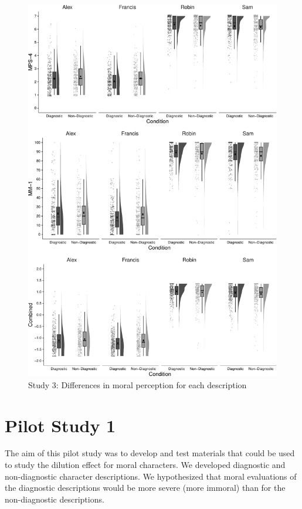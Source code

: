 \documentclass[
  man,floatsintext]{apa6}
\begin{document}
\begin{figure}[!p]
\includegraphics{Supplementary_files/figure-latex/S3allscenariosPlot-1} \caption{Study 3: Differences in moral perception for each description}\label{fig:S3allscenariosPlot}
\end{figure}

\pagebreak

\section{Pilot Study 1}\label{pilot-study-1}

The aim of this pilot study was to develop and test materials that could be used to study the dilution effect for moral characters. We developed diagnostic and non-diagnostic character descriptions. We hypothesized that moral evaluations of the diagnostic descriptions would be more severe (more immoral) than for the non-diagnostic descriptions.
\end{document}
